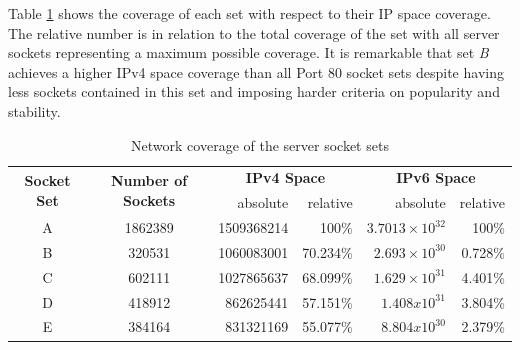 Table \ref{tab:ses_sets_coverage} shows the coverage of each set with respect to their IP space coverage. The relative number is in relation to the total coverage of the set with all server sockets representing a maximum possible coverage. It is remarkable that set \emph{B} achieves a higher IPv4 space coverage than all Port 80 socket sets despite having less sockets contained in this set and imposing harder criteria on popularity and stability. 
\begin{table}
	[ht] \centering 
	\begin{tabular}
		{|c|c|r|r|r|r|} \hline \multirow{2}{*}{\textbf{Socket Set}} & \multirow{2}{*}{\textbf{Number of Sockets}} & \multicolumn{2}{|c|}{\textbf{IPv4 Space}} & \multicolumn{2}{|c|}{\textbf{IPv6 Space}} \\
		\cline{3-6} & & absolute & relative & absolute & relative \\
		\hline A & 1862389 & 1509368214 & 100\% & $3.7013×10^{32}$ & 100\% \\
		\hline B & 320531 & 1060083001 & 70.234\% & $2.693×10^{30}$ & 0.728\% \\
		\hline C & 602111 & 1027865637 & 68.099\% & $1.629×10^{31}$ & 4.401\% \\
		\hline D & 418912 & 862625441 & 57.151\% & $1.408x10^{31}$ & 3.804\% \\
		\hline E & 384164 & 831321169 & 55.077\% & $8.804x10^{30}$ & 2.379\% \\
		\hline 
		
	\end{tabular}
	\caption{Network coverage of the server socket sets} 
	\label{tab:ses_sets_coverage} 
\end{table}

